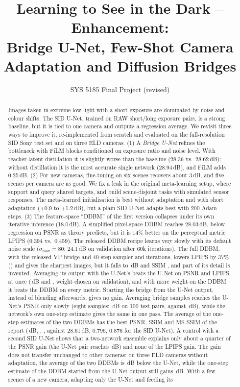 \documentclass[11pt]{article}
\title{Learning to See in the Dark -- Enhancement:\\Bridge U-Net, Few-Shot Camera Adaptation and Diffusion Bridges}
\author{SYS 5185 Final Project (revised)}
\date{}
\begin{document}
\maketitle

\begin{abstract}
Images taken in extreme low light with a short exposure are dominated by noise and colour shifts. The SID U-Net, trained on RAW short/long exposure pairs, is a strong baseline, but it is tied to one camera and outputs a regression average. We revisit three ways to improve it, re-implemented from scratch and evaluated on the full-resolution SID Sony test set and on three ELD cameras. (1) A \emph{Bridge U-Net} refines the bottleneck with FiLM blocks conditioned on exposure ratio and noise level. With teacher-latent distillation it is slightly worse than the baseline (28.36 vs.\ 28.62\,dB); without distillation it is the most accurate single network (28.94\,dB), and FiLM adds 0.25\,dB. (2) For new cameras, fine-tuning on six scenes recovers about 3\,dB, and five scenes per camera are as good. We fix a leak in the original meta-learning setup, where support and query shared targets, and build scene-disjoint tasks with simulated sensor responses. The meta-learned initialisation is best without adaptation and with short adaptation (+0.9 to +1.2\,dB), but a plain SID U-Net adapts best with 200 Adam steps. (3) The feature-space ``DDBM'' of the first version collapses under its own iterative inference (18.0\,dB). A simplified pixel-space DDBM reaches 28.03\,dB, below regression on PSNR as theory predicts, but it is 14\% better on the perceptual metric LPIPS (0.394 vs.\ 0.459). The released DDBM recipe learns very slowly with its default noise scale ($\sigma_{\max}=80$: 24.1\,dB on validation after 60k iterations). The full DDBM, with the released VP bridge and 40-step sampler and \VPITERS{} iterations, lowers LPIPS by 37\% (\VPFORTYLPIPS{}) and gives the sharpest images, but it falls to \VPFORTYPSNR\,dB and SSIM \VPFORTYSSIM{}, and part of its detail is invented. Averaging its output with the U-Net's beats the U-Net on PSNR and LPIPS at once (\BLENDQPSNR\,dB and \BLENDQLPIPS{}, weight chosen on validation), and with more weight on the DDBM it beats the DDBM on every metric. Starting the bridge from the U-Net output, instead of blending afterwards, gives no gain. Averaging bridge samples reaches the U-Net's PSNR only slowly (eight samples: \MSEIGHTPSNR\,dB on 100 test pairs, against \MSUNETPSNR\,dB), while the network's own one-step estimate gives the same in one pass. The average of the one-step estimates of the two DDBMs has the best PSNR, SSIM and MS-SSIM of the report (\STEPAVGPSNR\,dB, \STEPAVGSSIM{}, \STEPAVGMS{}, against 28.61\,dB, 0.796, 0.876 for the SID U-Net). A control with a second SID U-Net shows that a two-network ensemble explains only about a quarter of the PSNR gain (the U-Net pair reaches \UABPSNR\,dB) and none of the LPIPS gain. The gain does not transfer unchanged to other cameras: on three ELD cameras without adaptation, the average of the two DDBMs is \XPAIRAABS\,dB below the U-Net, while the one-step estimate of the DDBM started from the U-Net output still gains \XUSA\,dB. With a few scenes of a new camera, adapting only the U-Net and feeding its 
\end{abstract}
\end{document}
